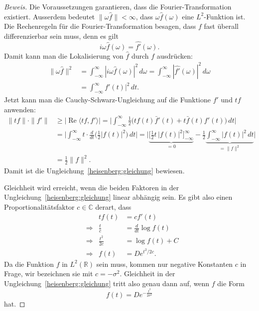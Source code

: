 \begin{proof}[Beweis]
Die Voraussetzungen garantieren, dass die Fourier-Transformation existiert.
Ausserdem bedeutet $\|\omega\hat{f}\|<\infty$, dass $\omega\hat{f}(\omega)$ 
eine $L^2$-Funktion ist.
Die Rechenregeln für die Fourier-Transformation besagen, dass 
$f$ fast überall differenzierbar sein muss, denn es gilt
\[
i\omega \hat{f}(\omega) = \widehat {f'}(\omega).
\]
Damit kann man die Lokalisierung von $\hat{f}$ durch $f$ ausdrücken:
\begin{align*}
\|\omega \hat{f}\|^2
&=
\int_{-\infty}^\infty |i\omega \hat{f}(\omega)|^2\,d\omega
=
\int_{-\infty}^\infty |\widehat{f'}(\omega)|^2\,d\omega
\\
&=
\int_{-\infty}^\infty f'(t)|^2\,dt.
\end{align*}
Jetzt kann man die Cauchy-Schwarz-Ungleichung auf die Funktione $f'$ und $tf$
anwenden:
\begin{align*}
\|tf\| \cdot \| f'\|
&\ge
| \operatorname{Re}\langle tf,f'\rangle |
=
\biggl|
\int_{-\infty}^\infty
\frac 12\bigl( tf(t)\bar{f}'(t)  + t\bar{f}(t)f'(t)\biggr)\,dt
\biggr|
\\
&=
\biggl|
\int_{-\infty}^\infty t\cdot \frac{d}{dt}\biggl(\frac12|f(t)|^2\biggr)\,dt
\biggr|
=
\biggl|
\underbrace{
\biggl[
\frac12 t\,|f(t)|^2
\biggr]_{-\infty}^{\infty}
}_{\displaystyle=0}
-
\frac12\underbrace{\int_{-\infty}^\infty |f(t)|^2\,dt}_{\displaystyle=\|f\|^2}
\biggr|
\\
&=
\frac12 \|f\|^2.
\end{align*}
Damit ist die Ungleichung~\eqref{heisenberg:gleichung} bewiesen.

Gleichheit wird erreicht, wenn die beiden Faktoren in der 
Ungleichung~\eqref{heisenberg:gleichung} linear abhängig sein.
Es gibt also einen Proportionalitätsfaktor $c\in\mathbb C$ derart,
dass
\[
\begin{aligned}
&&
tf(t)&=cf'(t)
\\
&\Rightarrow&
\frac{t}{c}&=\frac{d}{dt}\log f(t)
\\
&\Rightarrow&
\frac{t^2}{2c}&=\log f(t) + C
\\
&\Rightarrow&
f(t)&=De^{t^2/2c}.
\end{aligned}
\]
Da die Funktion $f$ in $L^2(\mathbb R)$ sein muss, kommen nur negative
Konstanten $c$ in Frage, wir bezeichnen sie mit $c=-\sigma^2$.
Gleichheit in der Ungleichung~\eqref{heisenberg:gleichung} tritt also
genau dann auf, wenn $f$ die Form
\[
f(t) = D e^{-\frac{t^2}{2\sigma^2}}
\]
hat.
\end{proof}



